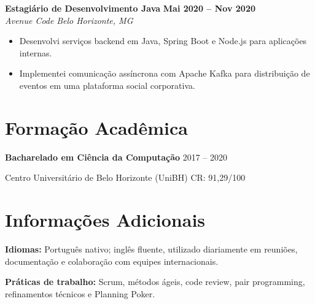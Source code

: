 \documentclass[10pt,a4paper]{article}
\newcommand{\job}[4]{%
  \textbf{#1} \hfill \textbf{#2}\\
  \textit{#3} \hfill \textit{#4}\\[-2pt]
}
\begin{document}
\job{Estagiário de Desenvolvimento Java}{Mai 2020 -- Nov 2020}{Avenue Code}{Belo Horizonte, MG}

\begin{itemize}

\item Desenvolvi serviços backend em Java, Spring Boot e Node.js para aplicações internas.

\item Implementei comunicação assíncrona com Apache Kafka para distribuição de eventos em uma plataforma social corporativa.

\end{itemize}

\section{Formação Acadêmica}

\textbf{Bacharelado em Ciência da Computação} \hfill 2017 -- 2020

Centro Universitário de Belo Horizonte (UniBH) \hfill CR: 91,29/100

\section{Informações Adicionais}

\textbf{Idiomas:} Português nativo; inglês fluente, utilizado diariamente em reuniões, documentação e colaboração com equipes internacionais.

\textbf{Práticas de trabalho:} Scrum, métodos ágeis, code review, pair programming, refinamentos técnicos e Planning Poker.
\end{document}
